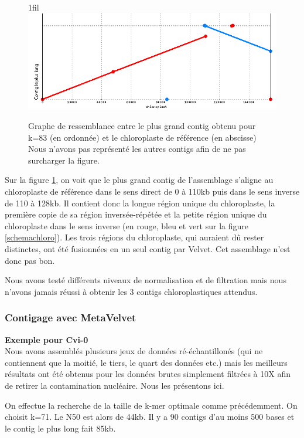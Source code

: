 \documentclass[a4paper]{article}
\makeatletter
\newcommand*{\centerfloat}{%
  \parindent \z@
  \leftskip \z@ \@plus 1fil \@minus \textwidth
  \rightskip\leftskip
  \parfillskip \z@skip}
\makeatother
\begin{document}
\begin{figure}[!ht]
\centerfloat
\includegraphics[scale=0.7] {Assemblage/chloro_83.png}
\caption{Graphe de ressemblance entre le plus grand contig obtenu pour k=83 (en ordonnée) et le chloroplaste de référence (en abscisse)\\
Nous n'avons pas représenté les autres contigs afin de ne pas surcharger la figure.}
\label{chloro_83}
\end{figure}

Sur la figure \ref{chloro_83}, on voit que le plus grand contig de l'assemblage s'aligne au chloroplaste de référence dans le sens direct de 0 à 110kb puis dans le sens inverse de 110 à 128kb. Il contient donc la longue région unique du chloroplaste, la première copie de sa région inversée-répétée et la petite région unique du chloroplaste dans le sens inverse (en rouge, bleu et vert sur la figure \ref{schemachloro}). Les trois régions du chloroplaste, qui auraient dû rester distinctes, ont été fusionnées en un seul contig par Velvet. Cet assemblage n'est donc pas bon.

Nous avons testé différents niveaux de normalisation et de filtration mais nous n'avons jamais réussi à obtenir les 3 contigs chloroplastiques attendus. 

\subsubsection{Contigage avec MetaVelvet}
\hspace{1.5cm}\textbf{\small Exemple pour Cvi-0}\\

Nous avons assemblés plusieurs jeux de données ré-échantillonés (qui ne contiennent que la moitié, le tiers, le quart des données etc.) mais les meilleurs résultats ont été obtenus pour les données brutes simplement filtrées à 10X afin de retirer la contamination nucléaire. Nous les présentons ici. 

On effectue la recherche de la taille de k-mer optimale comme précédemment. On choisit k=71. Le N50 est alors de 44kb. Il y a 90 contigs d'au moins 500 bases et le contig le plus long fait 85kb. 
\end{document}
